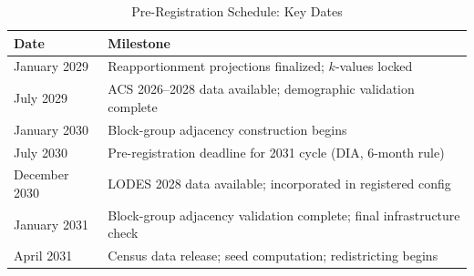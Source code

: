 \begin{table}[ht]
\centering
\caption{Pre-Registration Schedule: Key Dates}
\label{tab:registration}
\begin{tabular}{ll}
\toprule
Date & Milestone \\
\midrule
January 2029 & Reapportionment projections finalized; $k$-values locked \\
July 2029 & ACS 2026--2028 data available; demographic validation complete \\
January 2030 & Block-group adjacency construction begins \\
July 2030 & Pre-registration deadline for 2031 cycle (DIA, 6-month rule) \\
December 2030 & LODES 2028 data available; incorporated in registered config \\
January 2031 & Block-group adjacency validation complete; final infrastructure check \\
April 2031 & Census data release; seed computation; redistricting begins \\
\bottomrule
\end{tabular}
\end{table}
